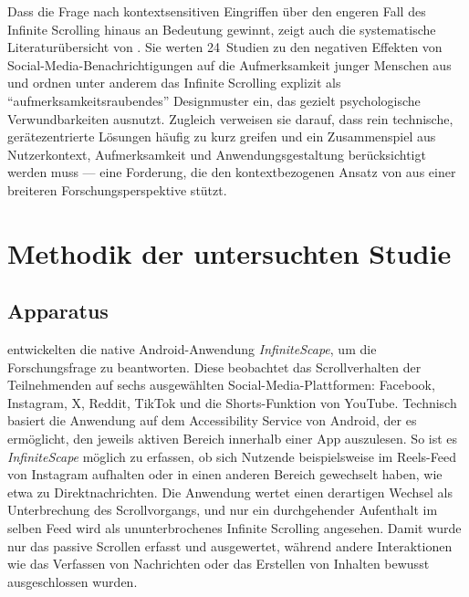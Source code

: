 \documentclass[11pt,a4paper]{article}
\begin{document}
Dass die Frage nach kontextsensitiven Eingriffen über den engeren Fall des Infinite
Scrolling hinaus an Bedeutung gewinnt, zeigt auch die systematische Literaturübersicht von
\citet{xavier2024notifications}. Sie werten 24~Studien zu den negativen Effekten von
Social-Media-Benachrichtigungen auf die Aufmerksamkeit junger Menschen aus und ordnen unter
anderem das Infinite Scrolling explizit als \enquote{aufmerksamkeitsraubendes} Designmuster
ein, das gezielt psychologische Verwundbarkeiten ausnutzt. Zugleich verweisen sie darauf,
dass rein technische, gerätezentrierte Lösungen häufig zu kurz greifen und ein
Zusammenspiel aus Nutzerkontext, Aufmerksamkeit und Anwendungsgestaltung berücksichtigt
werden muss --- eine Forderung, die den kontextbezogenen Ansatz von
\citet{meinhardt2025scrolling} aus einer breiteren Forschungsperspektive stützt.


\section{Methodik der untersuchten Studie}
\label{sec:methodik}

\subsection{Apparatus}

\citet{meinhardt2025scrolling} entwickelten die native Android-Anwendung
\emph{InfiniteScape}, um die Forschungsfrage zu beantworten. Diese beobachtet das
Scrollverhalten der Teilnehmenden auf sechs ausgewählten Social-Media-Plattformen: Facebook,
Instagram, X, Reddit, TikTok und die Shorts-Funktion von YouTube. Technisch basiert die
Anwendung auf dem Accessibility Service von Android, der es ermöglicht, den jeweils aktiven
Bereich innerhalb einer App auszulesen. So ist es \emph{InfiniteScape} möglich zu erfassen,
ob sich Nutzende beispielsweise im Reels-Feed von Instagram aufhalten oder in einen anderen
Bereich gewechselt haben, wie etwa zu Direktnachrichten. Die Anwendung wertet einen
derartigen Wechsel als Unterbrechung des Scrollvorgangs, und nur ein durchgehender
Aufenthalt im selben Feed wird als ununterbrochenes Infinite Scrolling angesehen. Damit
wurde nur das passive Scrollen erfasst und ausgewertet, während andere Interaktionen wie das
Verfassen von Nachrichten oder das Erstellen von Inhalten bewusst ausgeschlossen wurden.
\end{document}
